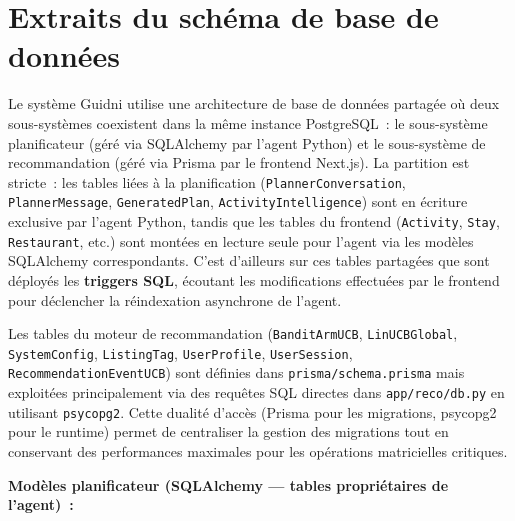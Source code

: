 \section{Extraits du schéma de base de données}
\label{ann:schema}

Le système Guidni utilise une architecture de base de données partagée où deux sous-systèmes
coexistent dans la même instance PostgreSQL~: le sous-système planificateur (géré via
SQLAlchemy par l'agent Python) et le sous-système de recommandation (géré via Prisma par le
frontend Next.js). La partition est stricte~: les tables liées à la planification (\texttt{PlannerConversation},
\texttt{PlannerMessage}, \texttt{GeneratedPlan}, \texttt{ActivityIntelligence}) sont en
écriture exclusive par l'agent Python, tandis que les tables du frontend (\texttt{Activity},
\texttt{Stay}, \texttt{Restaurant}, etc.) sont montées en lecture seule pour l'agent via les modèles
SQLAlchemy correspondants. C'est d'ailleurs sur ces tables partagées que sont déployés les \textbf{triggers SQL}, 
écoutant les modifications effectuées par le frontend pour déclencher la réindexation asynchrone de l'agent.

Les tables du moteur de recommandation (\texttt{BanditArmUCB}, \texttt{LinUCBGlobal},
\texttt{SystemConfig}, \texttt{ListingTag}, \texttt{UserProfile}, \texttt{UserSession},
\texttt{RecommendationEventUCB}) sont définies dans \texttt{prisma/schema.prisma} mais exploitées
principalement via des requêtes SQL directes dans \texttt{app/reco/db.py} en utilisant
\texttt{psycopg2}. Cette dualité d'accès (Prisma pour les migrations, psycopg2 pour le
runtime) permet de centraliser la gestion des migrations tout en conservant des performances
maximales pour les opérations matricielles critiques.

\textbf{Modèles planificateur (SQLAlchemy — tables propriétaires de l'agent)~:}

